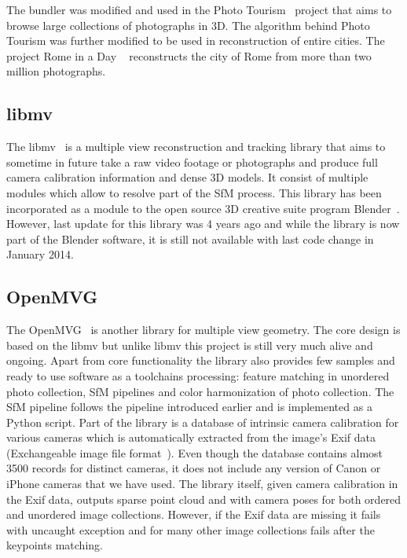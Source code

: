 The bundler was modified and used in the Photo Tourism~\cite{article:photo_tourism, article:photo_tourism2} project that aims to browse large collections of photographs in 3D. The algorithm behind Photo Tourism was further modified to be used in reconstruction of entire cities. The project Rome in a Day ~\cite{article:rome_in_a_day, article:reconstructing_rome, article:rome_in_a_day2} reconstructs the city of Rome from more than two million photographs.

\subsection*{libmv}
The libmv~\cite{www:libmv} is a multiple view reconstruction and tracking library that aims to sometime in future take a raw video footage or photographs and produce full camera calibration information and dense 3D models. It consist of multiple modules which allow to resolve part of the SfM process. This library has been incorporated as a module to the open source 3D creative suite program Blender~\cite{www:blender}. However, last update for this library was 4 years ago and while the library is now part of the Blender software, it is still not available with last code change in January 2014.

\subsection*{OpenMVG}
The OpenMVG~\cite{openMVG} is another library for multiple view geometry. The core design is based on the libmv but unlike libmv this project is still very much alive and ongoing. Apart from core functionality the library also provides few samples and ready to use software as a toolchains processing: feature matching in unordered photo collection, SfM pipelines and color harmonization of photo collection. The SfM pipeline follows the pipeline introduced earlier and is implemented as a Python script. Part of the library is a database of intrinsic camera calibration for various cameras which is automatically extracted from the image's Exif data (Exchangeable image file format~\cite{www:exif}). Even though the database contains almost 3500 records for distinct cameras, it does not include any version of Canon  or iPhone cameras that we have used. The library itself, given camera calibration in the Exif data, outputs sparse point cloud and with camera poses for both ordered and unordered image collections. However, if the Exif data are missing it fails with uncaught exception and for many other image collections fails after the keypoints matching.

